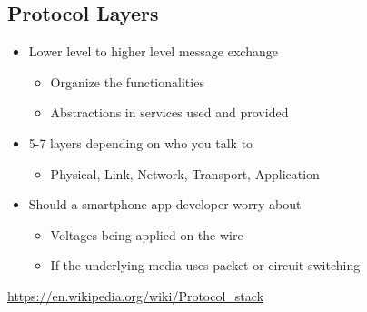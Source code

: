 \subsection{Protocol Layers}
\begin{itemize}[nosep]
    \item Lower level to higher level message exchange
          \begin{itemize}[nosep]
              \item Organize the functionalities
              \item Abstractions in services used and provided
          \end{itemize}
    \item 5-7 layers depending on who you talk to
          \begin{itemize}[nosep]
              \item Physical, Link, Network, Transport, Application
          \end{itemize}
    \item Should a smartphone app developer worry about
          \begin{itemize}[nosep]
              \item Voltages being applied on the wire
              \item If the underlying media uses packet or circuit switching
          \end{itemize}
\end{itemize}
\url{https://en.wikipedia.org/wiki/Protocol_stack}
